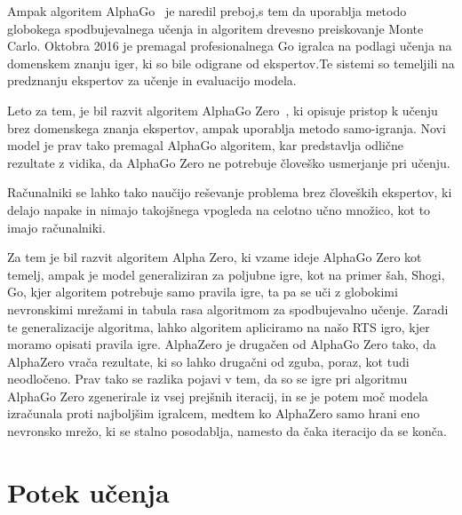 \documentclass[a4paper, 12pt]{book}
\begin{document}
Ampak algoritem AlphaGo~\cite{silver2016mastering} je naredil preboj,s tem da uporablja metodo globokega spodbujevalnega učenja in algoritem drevesno preiskovanje Monte Carlo. Oktobra 2016 je premagal profesionalnega Go igralca na podlagi učenja na domenskem znanju iger, ki so bile odigrane od ekspertov.Te sistemi so temeljili na predznanju ekspertov za učenje in evaluacijo modela.

Leto za tem, je bil razvit algoritem AlphaGo Zero~\cite{silver2017mastering}, ki opisuje pristop k učenju brez domenskega znanja ekspertov, ampak uporablja metodo samo-igranja. Novi model je prav tako premagal AlphaGo algoritem, kar predstavlja odlične rezultate z vidika, da AlphaGo Zero ne potrebuje človeško usmerjanje pri učenju.

Računalniki se lahko tako naučijo reševanje problema brez človeških ekspertov, ki delajo napake in nimajo takojšnega vpogleda na celotno učno množico, kot to imajo računalniki.

Za tem je bil razvit algoritem Alpha Zero, ki vzame ideje AlphaGo Zero kot temelj, ampak je model generaliziran za poljubne igre, kot na primer šah, Shogi, Go, kjer algoritem potrebuje samo pravila igre, ta pa se uči z globokimi nevronskimi mrežami in tabula rasa algoritmom za spodbujevalno učenje.
Zaradi te generalizacije algoritma, lahko algoritem apliciramo na našo RTS igro, kjer moramo opisati pravila igre.
AlphaZero je drugačen od AlphaGo Zero tako, da AlphaZero vrača rezultate, ki so lahko drugačni od zguba, poraz, kot tudi neodločeno.
Prav tako se razlika pojavi v tem, da so se igre pri algoritmu AlphaGo Zero zgenerirale iz vsej prejšnih iteracij, in se je potem moč modela izračunala proti najboljšim igralcem, medtem ko AlphaZero samo hrani eno nevronsko mrežo, ki se stalno posodablja, namesto da čaka iteracijo da se konča.
\section{Potek učenja}
\end{document}
